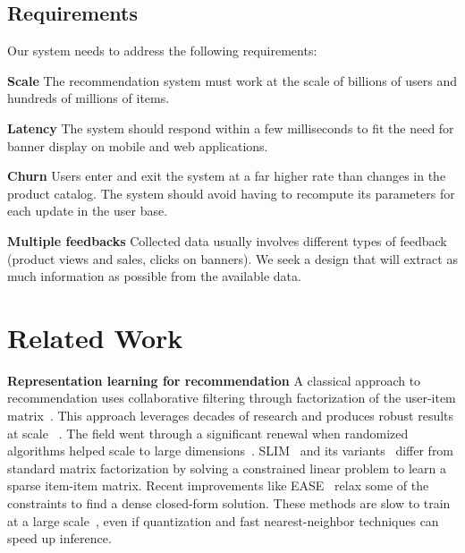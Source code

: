 \documentclass[sigconf]{acmart}
\begin{document}
\subsection{Requirements}
\label{subsec:requirements}

Our system needs to address the following requirements:

\textbf{Scale} The recommendation system must work at the scale of billions of users and hundreds of millions of items.



\textbf{Latency} The system should respond within a few milliseconds to fit the need for banner display on mobile and web applications. 



\textbf{Churn} Users enter and exit the system at a far higher rate than changes in the product catalog. The system should avoid having to recompute its parameters for each update in the user base.





\textbf{Multiple feedbacks} Collected data usually involves different types of feedback (product views and sales, clicks on banners). We seek a design that will extract as much information as possible from the available data.






\section{Related Work}
\label{related-work}

\textbf{Representation learning for recommendation} A classical approach to recommendation uses collaborative filtering through factorization of the user-item matrix~\cite{wmf}. This approach leverages decades of research and produces robust results at scale ~\cite{amazon,item-based-collaborative-filtering}. The field went through a significant renewal when randomized algorithms helped scale to large dimensions~\cite{finding-structure-2011, constantine-2011}. SLIM~\cite{slim} and its variants~\cite{efficient-slim,ease-vae} differ from standard matrix factorization by solving a constrained linear problem to learn a sparse item-item matrix. Recent improvements like EASE~\cite{ease-vae} relax some of the constraints to find a dense closed-form solution. These methods are slow to train at a large scale~\cite{variational-liang-2018}, even if quantization and fast nearest-neighbor techniques can speed up inference.
\end{document}

